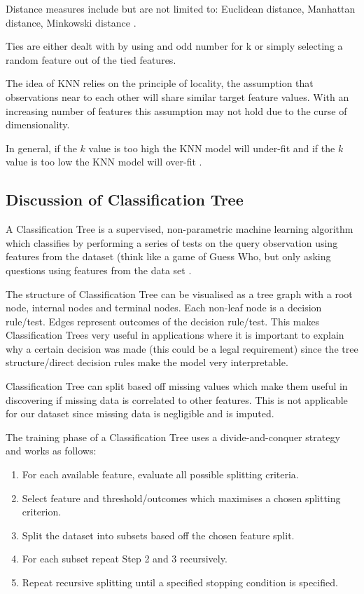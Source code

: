 \documentclass[conference]{IEEEtran}
\begin{document}
Distance measures include but are not limited to: Euclidean distance, Manhattan distance, Minkowski distance \cite[p.~11]{similarity}.

Ties are either dealt with by using and odd number for k or simply selecting a random feature out of the tied features\cite[p.~7]{similarity}.

The idea of KNN relies on the principle of locality, the assumption that observations near to each other will share similar target feature values. With an increasing number of features this assumption may not hold due to the curse of dimensionality.
 
In general, if the $k$ value is too high the KNN model will under-fit and if the $k$ value is too low the KNN model will over-fit \cite[p.~193]{fundamentals}.

\subsection{Discussion of Classification Tree}

A Classification Tree is a supervised, non-parametric machine learning algorithm which classifies by performing a series of tests on the query observation using features from the dataset (think like a game of Guess Who, but only asking questions using features from the data set \cite[p.~121]{fundamentals}.

The structure of Classification Tree can be visualised as a tree graph with a root node, internal nodes and terminal nodes. Each non-leaf node is a decision rule/test. Edges represent outcomes of the decision rule/test. This makes Classification Trees very useful in applications where it is important to explain why a certain decision was made (this could be a legal requirement) since the tree structure/direct decision rules make the model very interpretable.

Classification Tree can split based off missing values which make them useful in discovering if missing data is correlated to other features. This is not applicable for our dataset since missing data is negligible and is imputed.

The training phase of a Classification Tree uses a divide-and-conquer strategy and works as follows:

\begin{enumerate}
	\item For each available feature, evaluate all possible splitting criteria.
	\item Select feature and threshold/outcomes which maximises a chosen splitting criterion.
	\item Split the dataset into subsets based off the chosen feature split.
	\item For each subset repeat Step 2 and 3 recursively.
	\item Repeat recursive splitting until a specified stopping condition is specified.
\end{enumerate}
\end{document}
